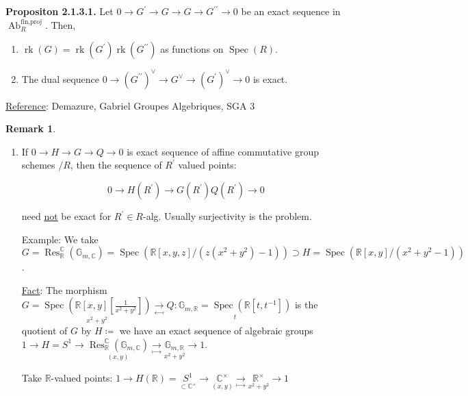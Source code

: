 \documentclass{article}
\theoremstyle{definition}
\numberwithin{theorem}{subsection}
\newtheorem*{remark}{Remark}
\begin{document}
    \textbf{Propositon 2.1.3.1.} Let \(0 \to G^{\prime} \to G \to G \to G^{\prime\prime} \to 0\) be an exact sequence in \(\operatorname{Ab}_R^{\text{fin,proj}}\). Then,

    \begin{enumerate}[label=\roman*)]
        \item \(\operatorname{rk}(G) = \operatorname{rk}(G^{\prime}) \operatorname{rk}(G^{\prime\prime})\) as functions on \(\operatorname{Spec}(R)\).
        \item The dual sequence \(0 \to (G^{\prime\prime})^\vee \to G^\vee \to (G^{\prime})^\vee \to 0\) is exact.  
    \end{enumerate} 

    \underline{Reference}: Demazure, Gabriel Groupes Algebriques, SGA 3

    \begin{remark}
        \begin{enumerate}[label=\arabic*)]
            \item If \(0 \to H \to G \to Q \to 0\) is exact sequence of affine commutative group schemes \(/ R\), then the sequence of \(R^{\prime}\) valued points:
            
            \[
                0 \to H(R^{\prime}) \to G(R^{\prime}) Q(R^{\prime}) \to 0
            \]

            need \underline{not} be exact for \(R^{\prime} \in R\)-alg. Usually surjectivity is the problem.

            Example: We take \(G = \operatorname{Res}_{\mathbb{R}}^\mathbb{C} (\mathbb{G}_{m,\mathbb{C}}) = \operatorname{Spec}(\mathbb{R}[x,y,z] / (z(x^2 + y^2) - 1)) \supset H = \operatorname{Spec}(\mathbb{R}[x,y] / (x^2 + y^2 - 1))\).

            \underline{Fact}: The morphism \(G = \underset{x^2 + y^2}{\operatorname{Spec}(\mathbb{R}[x,y]\left[ \frac{1}{x^2 + y^2} \right])} \underset{\mapsfrom}{\to}  Q: \underset{t}{\mathbb{G}_{m,\mathbb{R}} = \operatorname{Spec}(\mathbb{R}[t,t ^{-1}])}\) is the quotient of \(G\) by \(H \coloneqq \) we have an exact sequence of algebraic groups \(1 \to H = S^1 \to \underset{(x,y)}{\operatorname{Res}^\mathbb{C}_{\mathbb{R}}(\mathbb{G}_{m,\mathbb{C}})} \underset{\mapsto}{\to} \underset{x^2 + y^2}{\mathbb{G}_{m,\mathbb{R}}} \to 1\).
            
            Take \(\mathbb{R}\)-valued points: \(1 \to H(\mathbb{R}) = \underset{\subset \mathbb{C}^\times}{S^1} \to \underset{(x,y)}{\mathbb{C}^\times} \underset{\mapsto}{\to} \underset{x^2 + y^2}{\mathbb{R}^\times} \to 1 \)
            

\end{enumerate}
\end{remark}
\end{document}
